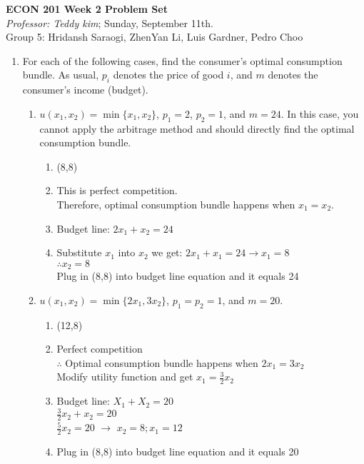 \documentclass[11pt]{article}
\begin{document}
\begin{center}
\textbf{ECON 201 Week 2 Problem Set}\\
\textit {Professor: Teddy kim};  
Sunday, September 11th.
\\Group 5: Hridansh Saraogi, ZhenYan Li, Luis Gardner, Pedro Choo
\end{center}

\begin{enumerate}

\item For each of the following cases, find the consumer's optimal consumption bundle. As usual, $p_{i}$ denotes the price of good $i$, and $m$ denotes the consumer's income (budget).
    \begin{enumerate}
        \item $u(x_{1},x_{2})=\min\{x_{1},x_{2}\}$, $p_{1}=2$, $p_{2}=1$, and $m=24$. In this case, you cannot apply the arbitrage method and should directly find the optimal consumption bundle.
        \begin{enumerate}
            \item (8,8)
            \item This is perfect competition. \\
            Therefore, optimal consumption bundle happens when $x_{1}=x_{2}$.
            \item Budget line: $2x_{1}+x_{2}=24$
            \item Substitute $x_{1}$ into $x_{2}$ we get: $2x_{1}+x_{1}=24 \rightarrow x_{1}=8$\\
            $\therefore x_{2} = 8$ 
            \\ Plug in (8,8) into budget line equation and it equals 24
        \end{enumerate}

        \item $u(x_{1},x_{2})=\min\{2x_{1},3x_{2}\}$, $p_{1}=p_{2}=1$, and $m=20$.
        \begin{enumerate}
            \item (12,8)
            \item Perfect competition\\
            $\therefore$ Optimal consumption bundle happens when $2x_{1} = 3x_{2}$\\
            Modify utility function and get $x_{1} = \frac{3}{2} x_{2}$
            \item Budget line: $X_{1}+X_{2}=20$\\
            $\frac{3}{2} x_{2} + x_{2} = 20$\\
            $\frac{5}{2}x_{2} = 20$ $\rightarrow$ $x_{2}=8; x_{1}=12$
            \item Plug in (8,8) into budget line equation and it equals 20
        \end{enumerate}


\end{enumerate}
\end{enumerate}
\end{document}
